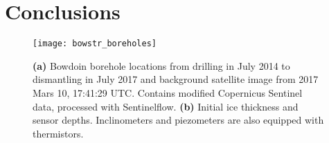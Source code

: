 \documentclass[utf8]{article}
\begin{document}

\section{Conclusions}






%
%



    \begin{figure}
      \centerline{\texttt{[image: bowstr\_boreholes]}}
      \caption{%
        \textbf{(a)} Bowdoin borehole locations from drilling in July 2014 to
          dismantling in July 2017 and background satellite image from 2017
          Mars 10, 17:41:29 UTC. Contains modified Copernicus Sentinel data,
          processed with Sentinelflow.
        \textbf{(b)} Initial ice thickness and sensor depths. Inclinometers
          and piezometers are also equipped with thermistors.}
      \label{fig:boreholes}
    \end{figure}
\end{document}
